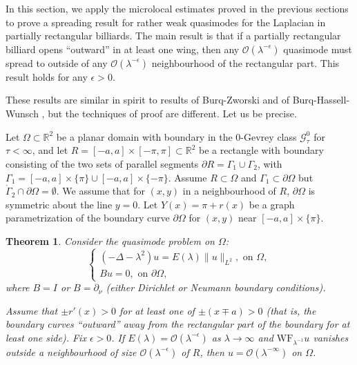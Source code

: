 \documentclass[twoside, final]{amsart}
\newtheorem{theorem}{Theorem}
\theoremstyle{definition}
\numberwithin{equation}{section}
\begin{document}
In this section, we apply the microlocal estimates proved in the
previous sections to prove a spreading result for rather weak quasimodes for the
Laplacian in partially rectangular billiards.  The main result is that
if a partially rectangular billiard opens ``outward'' in at least one
wing, then any ${{\mathcal O}}( \lambda^{-\epsilon})$ quasimode must spread to
outside of any ${{\mathcal O}}(\lambda^{-\epsilon})$ neighbourhood of the
rectangular part.  This result holds for any $\epsilon>0$.

These results are similar in
spirit to results of Burq-Zworski \cite{BuZw-bb} and of Burq-Hassell-Wunsch
\cite{BHW-spread}, but the techniques of proof
are different.  
Let us be precise.  

Let $\Omega \subset {{\mathbb R}}^2$ be a planar domain with boundary in the
0-Gevrey class ${\mathcal{G}}^0_\tau$ for $\tau < \infty$, and let $R = [-a,a]
\times [-\pi, \pi] \subset {{\mathbb R}}^2$ be a rectangle with boundary
consisting of the two sets of parallel segments ${\partial} R = \Gamma_1 \cup
\Gamma_2$, with $\Gamma_1 = [-a,a] \times \{ \pi \} \cup [-a,a] \times
\{ - \pi \}$.  Assume $R \subset \Omega$ and $\Gamma_1 \subset {\partial}
\Omega$ but $\mathring{\Gamma}_2 \cap {\partial} \Omega = \emptyset$.  We assume that for $(x, y)$ in a neighbourhood of $R$, ${\partial}
\Omega$ is symmetric about the line $y = 0$.  Let $Y(x) = \pi + r(x)$ be a graph parametrization of the boundary curve ${\partial} \Omega$ for
$(x,y)$ near $[-a,a] \times \{ \pi \}$.

\begin{theorem}
\label{T:billiards}
Consider the quasimode problem on $\Omega$:
\[
\begin{cases}
(-\Delta - \lambda^2) u = E(\lambda) \| u \|_{L^2}, \text{ on }
\Omega, \\
B u = 0, \text{ on } {\partial} \Omega,
\end{cases}
\]
where $B = I$ or $B = {\partial}_\nu$ (either Dirichlet or Neumann boundary
conditions).

Assume that $\pm r'(x)>0$ for at least one of $\pm (x \mp a) >0$ (that is, the
boundary curves ``outward'' away from the rectangular part of the
boundary for at least one side).  Fix $\epsilon>0$.  If $E(\lambda) = {{\mathcal O}}(\lambda^{-\epsilon})$ as $\lambda \to \infty$ and ${\mathrm{WF}}_{\lambda^{-1}}
u$ vanishes outside a neighbourhood of size
${{\mathcal O}}(\lambda^{-\epsilon})$ of $R$, then $u = {{\mathcal O}}(\lambda^{-\infty})$ on
$\Omega$.

\end{theorem}
\end{document}
